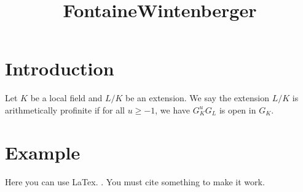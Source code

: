 \title{FontaineWintenberger}




\maketitle


\tableofcontents
\section{Introduction}

\begin{definition}
    Let $K$ be a local field and $L/K$ be an extension. We say the extension $L/K$ is arithmetically profinite if for all $u\geq -1$, we have $G_K^uG_L$ is open in $G_K$. 
\end{definition}

\section{Example}
Here you can use LaTex. \cite{marcus}. You must cite something to make it work.


